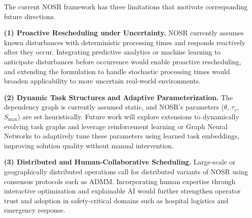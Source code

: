 \documentclass[manuscript,screen,review]{acmart}
\begin{document}
The current NOSR framework has three limitations that motivate
corresponding future directions.

\textbf{(1) Proactive Rescheduling under Uncertainty.}
NOSR currently assumes known disturbances with deterministic processing
times and responds reactively after they occur. Integrating predictive
analytics or machine learning to anticipate disturbances before
occurrence would enable proactive rescheduling, and extending the
formulation to handle stochastic processing times would broaden
applicability to more uncertain real-world environments.

\textbf{(2) Dynamic Task Structures and Adaptive Parameterization.}
The dependency graph is currently assumed static, and NOSR's parameters
($\theta$, $\tau_s$, $S_{\max}$) are set heuristically. Future work
will explore extensions to dynamically evolving task graphs and
leverage reinforcement learning or Graph Neural Networks to adaptively
tune these parameters using learned task embeddings, improving solution
quality without manual intervention.

\textbf{(3) Distributed and Human-Collaborative Scheduling.}
Large-scale or geographically distributed operations call for
distributed variants of NOSR using consensus protocols such as ADMM.
Incorporating human expertise through interactive optimization and
explainable AI would further strengthen operator trust and adoption in
safety-critical domains such as hospital logistics and emergency
response.



\end{document}

